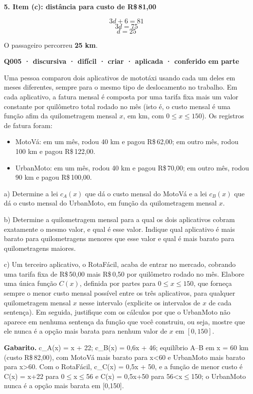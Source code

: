 \documentclass[11pt,a4paper]{article}
\begin{document}
\textbf{5. Item (c): distância para custo de R\$\,81,00}

$$3d + 6 = 81$$
$$3d = 75$$
$$d = 25$$

O passageiro percorreu \textbf{25 km}.

\bigskip\noindent\textbf{Q005 · discursiva · difícil · criar · aplicada · conferido em parte}\par\nopagebreak
Uma pessoa comparou dois aplicativos de mototáxi usando cada um deles em meses diferentes, sempre para o mesmo tipo de deslocamento no trabalho. Em cada aplicativo, a fatura mensal é composta por uma tarifa fixa mais um valor constante por quilômetro total rodado no mês (isto é, o custo mensal é uma função afim da quilometragem mensal $x$, em km, com $0 \le x \le 150$). Os registros de fatura foram:

\begin{itemize}[nosep,leftmargin=*]
\item MotoVá: em um mês, rodou 40 km e pagou R\$\,62,00; em outro mês, rodou 100 km e pagou R\$\,122,00.
\item UrbanMoto: em um mês, rodou 40 km e pagou R\$\,70,00; em outro mês, rodou 90 km e pagou R\$\,100,00.
\end{itemize}

a) Determine a lei $c_A(x)$ que dá o custo mensal do MotoVá e a lei $c_B(x)$ que dá o custo mensal do UrbanMoto, em função da quilometragem mensal $x$.

b) Determine a quilometragem mensal para a qual os dois aplicativos cobram exatamente o mesmo valor, e qual é esse valor. Indique qual aplicativo é mais barato para quilometragens menores que esse valor e qual é mais barato para quilometragens maiores.

c) Um terceiro aplicativo, o RotaFácil, acaba de entrar no mercado, cobrando uma tarifa fixa de R\$\,50,00 mais R\$\,0,50 por quilômetro rodado no mês. Elabore uma única função $C(x)$, definida por partes para $0 \le x \le 150$, que forneça sempre o menor custo mensal possível entre os três aplicativos, para qualquer quilometragem mensal $x$ nesse intervalo (explicite os intervalos de $x$ de cada sentença). Em seguida, justifique com os cálculos por que o UrbanMoto não aparece em nenhuma sentença da função que você construiu, ou seja, mostre que ele nunca é a opção mais barata para nenhum valor de $x$ em $[0,150]$.

\textbf{Gabarito.} c\_A(x) = x + 22; c\_B(x) = 0,6x + 46; equilíbrio A–B em x = 60 km (custo R\$\,82,00), com MotoVá mais barato para x<60 e UrbanMoto mais barato para x>60. Com o RotaFácil, c\_C(x) = 0,5x + 50, e a função de menor custo é C(x) = x+22 para 0$\le$x$\le$56 e C(x) = 0,5x+50 para 56<x$\le$150; o UrbanMoto nunca é a opção mais barata em [0,150].
\end{document}
